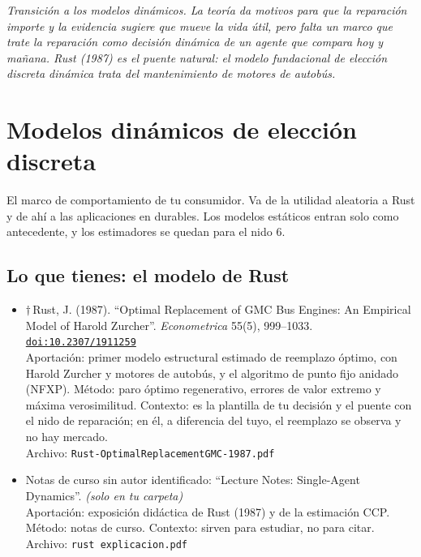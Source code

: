\documentclass[11pt]{article}
\begin{document}
\medskip
\noindent\textit{Transición a los modelos dinámicos. La teoría da motivos para que la reparación importe y la evidencia sugiere que mueve la vida útil, pero falta un marco que trate la reparación como decisión dinámica de un agente que compara hoy y mañana. Rust (1987) es el puente natural: el modelo fundacional de elección discreta dinámica trata del mantenimiento de motores de autobús.}

\section{Modelos dinámicos de elección discreta}
El marco de comportamiento de tu consumidor. Va de la utilidad aleatoria a Rust y de ahí a las aplicaciones en durables. Los modelos estáticos entran solo como antecedente, y los estimadores se quedan para el nido 6.

\subsection*{Lo que tienes: el modelo de Rust}
\begin{itemize}
\item $\dagger$\,Rust, J. (1987). ``Optimal Replacement of GMC Bus Engines: An Empirical Model of Harold Zurcher''. \textit{Econometrica} 55(5), 999--1033. \href{https://doi.org/10.2307/1911259}{\texttt{doi:10.2307/1911259}}\\
Aportación: primer modelo estructural estimado de reemplazo óptimo, con Harold Zurcher y motores de autobús, y el algoritmo de punto fijo anidado (NFXP). Método: paro óptimo regenerativo, errores de valor extremo y máxima verosimilitud. Contexto: es la plantilla de tu decisión y el puente con el nido de reparación; en él, a diferencia del tuyo, el reemplazo se observa y no hay mercado.\\
{\footnotesize Archivo: \texttt{Rust-OptimalReplacementGMC-1987.pdf}}
\item Notas de curso sin autor identificado: ``Lecture Notes: Single-Agent Dynamics''. \textit{(solo en tu carpeta)}\\
Aportación: exposición didáctica de Rust (1987) y de la estimación CCP. Método: notas de curso. Contexto: sirven para estudiar, no para citar.\\
{\footnotesize Archivo: \texttt{rust explicacion.pdf}}
\end{itemize}
\end{document}
